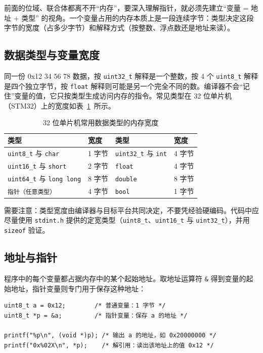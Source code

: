 前面的位域、联合体都离不开“内存”，要深入理解指针，就必须先建立“变量 = 地址 + 类型” 的视角。一个变量占用的内存本质上是一段连续字节：类型决定这段字节的宽度（占多少字节）和解释方式（按整数、浮点数还是地址来读）。

\subsection{数据类型与变量宽度}

同一份 0x12 34 56 78 数据，按 \texttt{uint32\_t} 解释是一个整数，按 4 个 \texttt{uint8\_t} 解释是四个独立字节，按 \texttt{float} 解释则可能是另一个完全不同的数。编译器不会“记住”变量的值，它只按类型生成访问内存的指令。常见类型在 32 位单片机（STM32）上的宽度如表~\ref{tab:type-size}~所示。

\begin{table}[htbp]
\centering \caption{32 位单片机常用数据类型的内存宽度} \label{tab:type-size}
    \begin{tabular}{llll}
        \toprule
        类型 & 宽度 & 类型 & 宽度 \\
        \midrule
        \texttt{uint8\_t} 与 \texttt{char} & 1 字节 & \texttt{uint32\_t} 与 \texttt{int} & 4 字节 \\
        \texttt{uint16\_t} 与 \texttt{short} & 2 字节 & \texttt{float} & 4 字节 \\
        \texttt{uint64\_t} 与 \texttt{long long} & 8 字节 & \texttt{double} & 8 字节 \\
        \texttt{指针（任意类型）} & 4 字节 & \texttt{bool} & 1 字节 \\
        \bottomrule
    \end{tabular}
\end{table}

需要注意：类型宽度由编译器与目标平台共同决定，不要凭经验硬编码。代码中应尽量使用 \texttt{stdint.h} 提供的定宽类型（\texttt{uint8\_t}、\texttt{uint16\_t} 与 \texttt{uint32\_t}），并用 \texttt{sizeof} 验证。

\subsection{地址与指针}

程序中的每个变量都占据内存中的某个起始地址。取地址运算符 \texttt{\&} 得到变量的起始地址，指针变量则专门用于保存这种地址：

\begin{lstlisting}[style=c]
uint8_t a = 0x12;        /* 普通变量：1 字节 */
uint8_t *p = &a;         /* 指针变量：保存 a 的地址 */

printf("%p\n", (void *)p); /* 输出 a 的地址，如 0x20000000 */
printf("0x%02X\n", *p);    /* 解引用：读出该地址上的值 0x12 */
\end{lstlisting}

